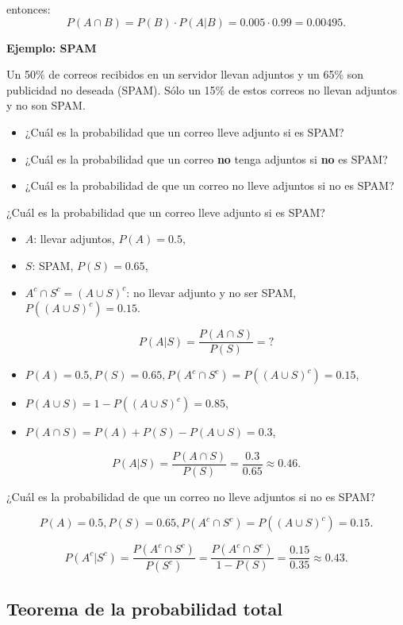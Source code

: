 \documentclass[]{book}
\providecommand{\tightlist}{%
  \setlength{\itemsep}{0pt}\setlength{\parskip}{0pt}}
\begin{document}
entonces:
\[P(A\cap B)=P(B)\cdot P(A|B)=0.005\cdot 0.99=0.00495.\]

\textbf{Ejemplo: SPAM}

Un 50\% de correos recibidos en un servidor llevan adjuntos y un 65\% son publicidad no deseada (SPAM). Sólo un 15\% de estos correos no llevan adjuntos y no son SPAM.

\begin{itemize}
\tightlist
\item
  ¿Cuál es la probabilidad que un correo lleve adjunto si es SPAM?
\item
  ¿Cuál es la probabilidad que un correo \textbf{no} tenga adjuntos si \textbf{no} es SPAM?
\item
  ¿Cuál es la probabilidad de que un correo no lleve adjuntos si no es SPAM?
\end{itemize}

¿Cuál es la probabilidad que un correo lleve adjunto si es SPAM?

\begin{itemize}
\tightlist
\item
  \(A\): llevar adjuntos, \(P(A)=0.5\),
\item
  \(S\): SPAM, \(P(S)=0.65\),
\item
  \(A^c\cap S^c=(A\cup S)^c\): no llevar adjunto y no ser SPAM, \(P((A\cup S)^c)=0.15\).
\end{itemize}

\[P(A|S)=\dfrac{P(A\cap S)}{P(S)}=?\]

\begin{itemize}
\item
  \(P(A)=0.5, P(S)=0.65, P(A^c\cap S^c)=P((A\cup S)^c)=0.15\),
\item
  \(P(A\cup S)=1-P((A\cup S)^c)=0.85\),
\item
  \(P(A\cap S)=P(A)+P(S)-P(A\cup S)=0.3\),
\end{itemize}

\[P(A|S)=\dfrac{P(A\cap S)}{P(S)}=\dfrac{0.3}{0.65}\approx 0.46.\]

¿Cuál es la probabilidad de que un correo no lleve adjuntos si no es SPAM?

\[P(A)=0.5, P(S)=0.65, P(A^c\cap S^c)=P((A\cup S)^c)=0.15.\]

\[P(A^c|S^c)=\dfrac{P(A^c\cap S^c)}{P(S^c)}=\dfrac{P(A^c\cap S^c)}{1-P(S)}=\dfrac{0.15}{0.35}\approx 0.43.\]

\hypertarget{teorema-de-la-probabilidad-total}{%
\subsection{Teorema de la probabilidad total}\label{teorema-de-la-probabilidad-total}}
\end{document}
